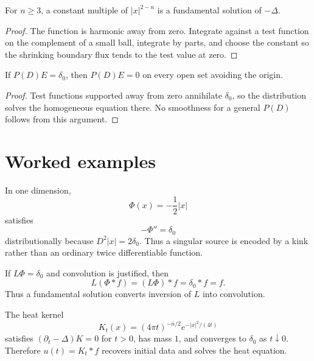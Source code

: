 \begin{theorem}\label{thm:iii24-02}
For $n\ge3$, a constant multiple of $|x|^{2-n}$ is a fundamental solution of $-\Delta$.
\begin{proof}
The function is harmonic away from zero. Integrate against a test function on the complement of a small ball, integrate by parts, and choose the constant so the shrinking boundary flux tends to the test value at zero.
\end{proof}
\end{theorem}

\begin{theorem}\label{thm:iii24-03}
If $P(D)E=\delta_0$, then $P(D)E=0$ on every open set avoiding the origin.
\begin{proof}
Test functions supported away from zero annihilate $\delta_0$, so the distribution solves the homogeneous equation there. No smoothness for a general $P(D)$ follows from this argument.
\end{proof}
\end{theorem}

\section{Worked examples}

\begin{example}\label{ex:iii24-worked-01}
In one dimension,
\[
\Phi(x)=-\frac12|x|
\]
satisfies
\[
-\Phi''=\delta_0
\]
distributionally because \(D^2|x|=2\delta_0\). Thus a singular source is
encoded by a kink rather than an ordinary twice differentiable function.
\end{example}

\begin{example}\label{ex:iii24-worked-02}
If \(L\Phi=\delta_0\) and convolution is justified, then
\[
L(\Phi*f)=(L\Phi)*f=\delta_0*f=f.
\]
Thus a fundamental solution converts inversion of \(L\) into convolution.
\end{example}

\begin{example}\label{ex:iii24-worked-03}
The heat kernel
\[
K_t(x)=(4\pi t)^{-n/2}e^{-|x|^2/(4t)}
\]
satisfies \((\partial_t-\Delta)K=0\) for \(t>0\), has mass \(1\), and converges
to \(\delta_0\) as \(t\downarrow0\). Therefore
\(u(t)=K_t*f\) recovers initial data and solves the heat equation.
\end{example}

